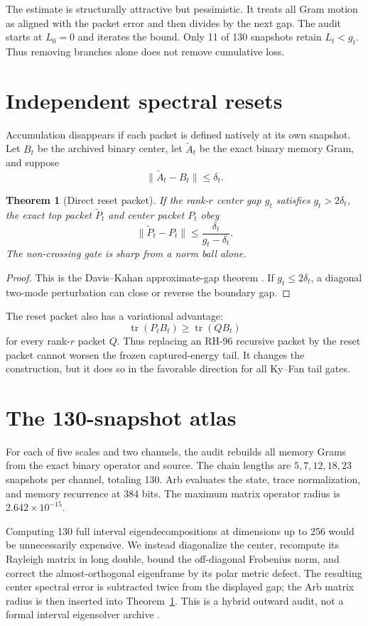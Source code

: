 \documentclass[12pt]{article}
\newtheorem{theorem}{Theorem}
\begin{document}
The estimate is structurally attractive but pessimistic.  It treats all Gram
motion as aligned with the packet error and then divides by the next gap.
The audit starts at $L_0=0$ and iterates the bound.  Only 11 of 130 snapshots
retain $L_t<g_t$.  Thus removing branches alone does not remove cumulative
loss.

\section{Independent spectral resets}
Accumulation disappears if each packet is defined natively at its own
snapshot.  Let $B_t$ be the archived binary center, let $\widetilde A_t$ be
the exact binary memory Gram, and suppose
\[
 \|\widetilde A_t-B_t\|\leq\delta_t.
\]

\begin{theorem}[Direct reset packet]\label{thm:reset}
If the rank-$r$ center gap $g_t$ satisfies $g_t>2\delta_t$, the exact top
packet $\widetilde P_t$ and center packet $P_t$ obey
\[
 \|\widetilde P_t-P_t\|
 \leq\frac{\delta_t}{g_t-\delta_t}.
\]
The non-crossing gate is sharp from a norm ball alone.
\end{theorem}
\begin{proof}
This is the Davis--Kahan approximate-gap theorem
\citep{DavisKahan1970,StewartSun1990}.  If $g_t\leq2\delta_t$, a diagonal
two-mode perturbation can close or reverse the boundary gap.
\end{proof}

The reset packet also has a variational advantage:
\[
 \operatorname{tr}(P_tB_t)
 \geq\operatorname{tr}(QB_t)
\]
for every rank-$r$ packet $Q$.  Thus replacing an RH-96 recursive packet by
the reset packet cannot worsen the frozen captured-energy tail.  It changes
the construction, but it does so in the favorable direction for all Ky--Fan
tail gates.

\section{The 130-snapshot atlas}
For each of five scales and two channels, the audit rebuilds all memory Grams
from the exact binary operator and source.  The chain lengths are
$5,7,12,18,23$ snapshots per channel, totaling 130.  Arb evaluates the state,
trace normalization, and memory recurrence at 384 bits.  The maximum matrix
operator radius is $2.642\times10^{-15}$.

Computing 130 full interval eigendecompositions at dimensions up to 256 would
be unnecessarily expensive.  We instead diagonalize the center, recompute
its Rayleigh matrix in long double, bound the off-diagonal Frobenius norm,
and correct the almost-orthogonal eigenframe by its polar metric defect.  The
resulting center spectral error is subtracted twice from the displayed gap;
the Arb matrix radius is then inserted into Theorem~\ref{thm:reset}.  This is
a hybrid outward audit, not a formal interval eigensolver archive
\citep{Johansson2017}.
\end{document}
